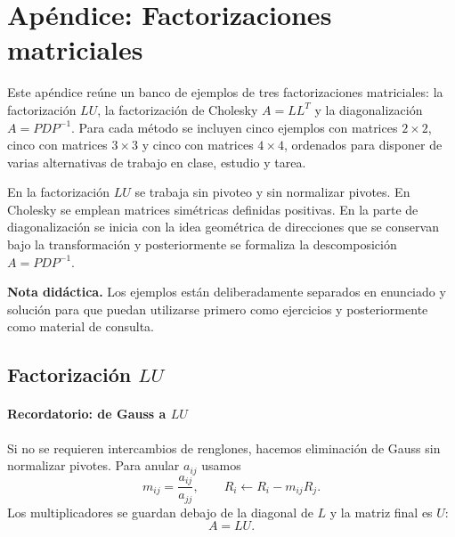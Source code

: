 %
%
%
%
%
\chapter*{Apéndice: Factorizaciones matriciales}

\noindent
Este apéndice reúne un banco de ejemplos de tres factorizaciones matriciales:
la factorización \(LU\), la factorización de Cholesky \(A=LL^{T}\) y la
diagonalización \(A=PDP^{-1}\). Para cada método se incluyen cinco ejemplos
con matrices \(2\times2\), cinco con matrices \(3\times3\) y cinco con
matrices \(4\times4\), ordenados para disponer de varias alternativas de
trabajo en clase, estudio y tarea.

En la factorización \(LU\) se trabaja sin pivoteo y sin normalizar pivotes.
En Cholesky se emplean matrices simétricas definidas positivas. En la parte
de diagonalización se inicia con la idea geométrica de direcciones que se
conservan bajo la transformación y posteriormente se formaliza la
descomposición \(A=PDP^{-1}\).

\medskip
\noindent\textbf{Nota didáctica.}
Los ejemplos están deliberadamente separados en enunciado y solución para
que puedan utilizarse primero como ejercicios y posteriormente como material
de consulta.

\section{Factorización $LU$}

\subsubsection*{Recordatorio: de Gauss a $LU$}

Si no se requieren intercambios de renglones, hacemos eliminación de Gauss sin normalizar pivotes. Para anular $a_{ij}$ usamos
\[
m_{ij}=\frac{a_{ij}}{a_{jj}},\qquad R_i\leftarrow R_i-m_{ij}R_j.
\]
Los multiplicadores se guardan debajo de la diagonal de $L$ y la matriz final es $U$:
\[
\boxed{A=LU}.
\]

